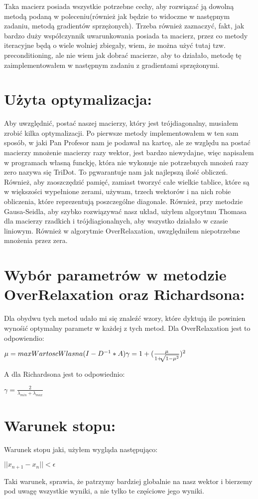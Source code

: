 \documentclass[12pt]{article}
\begin{document}
Taka macierz posiada wszystkie potrzebne cechy, aby rozwiązać ją dowolną metodą podaną w poleceniu(również jak będzie to widoczne w następnym zadaniu, metodą gradientów sprzężonych). Trzeba również zaznaczyć, fakt, jak bardzo duży współczynnik uwarunkowania posiada ta macierz, przez co metody iteracyjne będą o wiele wolniej zbiegały, wiem, że można użyć tutaj tzw. preconditioning, ale nie wiem jak dobrać macierze, aby to działało, metodę tę zaimplementowałem w następnym zadaniu z gradientami sprzężonymi.
\section{Użyta optymalizacja:}
Aby uwzględnić, postać naszej macierzy, który jest trójdiagonalny, musiałem zrobić kilka optymalizacji. Po pierwsze metody implementowałem w ten sam sposób, w jaki Pan Profesor nam je podawał na kartcę, ale ze względu na postać macierzy mnożenie macierzy razy wektor, jest bardzo niewydajne, więc napisałem w programach własną funckję, która nie wykonuje nie potrzebnych mnożeń razy zero nazywa się TriDot. To pgwarantuje nam jak najlepszą ilość obliczeń. Również, aby zaoszczędzić pamięć, zamiast tworzyć całe wielkie tablice, które są w większości wypełnione zerami, używam, trzech wektorów i na nich robie obliczenia, które reprezentują poszczególne diagonale. Również, przy metodzie Gausa-Seidla, aby szybko rozwiązywać nasz układ, użyłem algorytmu Thomasa dla macierzy rzadkich i trójdiagionalnych, aby wszystko działało w czasie liniowym. Również w algorytmie OverRelaxation, uwzględniłem niepotrzebne mnożenia przez zera.
\section{Wybór parametrów w metodzie OverRelaxation oraz Richardsona:}
Dla obydwu tych metod udało mi się znaleźć wzory, które dyktują ile powinien wynośić optymalny parametr w każdej z tych metod. Dla OverRelaxation jest to odpowiendio:
\begin{center}
    $
    \mu = maxWartoscWlasna(I - D^{-1}*A) \newline
    \gamma = 1 + (\frac{\mu}{1+\sqrt[]{1-\mu^{2}}})^{2}
    $
\end{center}
A dla Richardsona jest to odpowiednio:
\begin{center}
    $
    \gamma = \frac{2}{\lambda_{min}+\lambda_{max}}
    $
\end{center}
\section{Warunek stopu:}
Warunek stopu jaki, użyłem wygląda następująco:
\begin{center}
    $
    || x_{n+1} - x_{n} || < \epsilon
    $    
\end{center}
Taki warunek, sprawia, że patrzymy bardziej globalnie na nasz wektor i bierzemy pod uwagę wszystkie wyniki, a nie tylko te częściowe jego wyniki.
\end{document}
